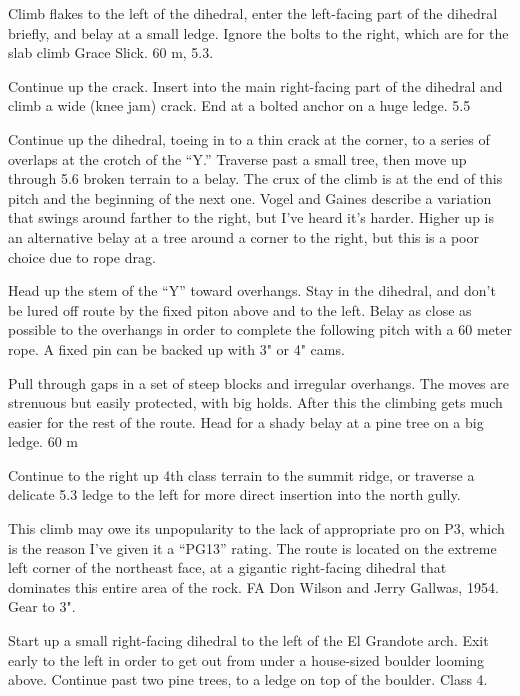 \documentclass{tahquitz}
\begin{document}
 Climb flakes to the left of the dihedral, enter the left-facing
part of the dihedral briefly, and belay at a small ledge. Ignore the
bolts to the right, which are for the slab climb Grace Slick. 60 m,
5.3.

 Continue up the crack. Insert into the main right-facing part of
the dihedral and climb a wide (knee jam) crack. End at a bolted
anchor on a huge ledge. 5.5

 Continue up the dihedral, toeing in to a thin crack at the
corner, to a series of overlaps at the crotch of the ``Y.'' Traverse
past a small tree, then move up through 5.6 broken terrain to a
belay. The crux of the climb is at the end of this pitch and the
beginning of the next one. Vogel and Gaines describe a variation that
swings around farther to the right, but I've heard it's harder.
Higher up is an alternative belay at a tree around a corner to the
right, but this is a poor choice due to rope drag.

 Head up the stem of the ``Y'' toward overhangs. Stay in the
dihedral, and don't be lured off route by the fixed piton above and
to the left. Belay as close as possible to the overhangs in order to
complete the following pitch with a 60 meter rope. A fixed pin can be
backed up with 3" or 4" cams.

 Pull through gaps in a set of steep blocks and irregular
overhangs. The  moves are strenuous but easily protected, with big
holds. After this the climbing gets much easier for the rest of the
route. Head for a shady belay at a pine tree on a big ledge. 60 m

 Continue to the right up 4th class terrain to the summit ridge,
or traverse a delicate 5.3 ledge to the left for more direct
insertion into the north gully.





This climb may owe its unpopularity to the lack of appropriate pro on P3, which is
the reason I've given it a ``PG13'' rating.
The route is located on the extreme left corner of the northeast
face, at a gigantic right-facing dihedral that dominates this entire area of the
rock. FA Don Wilson and Jerry Gallwas, 1954. Gear to 3".

 Start up a small right-facing dihedral to the left of the El Grandote arch.
Exit early to the left in order to get out from under a house-sized boulder
looming above. Continue past two pine trees, to
a ledge on top of the boulder.
Class 4.
\end{document}
